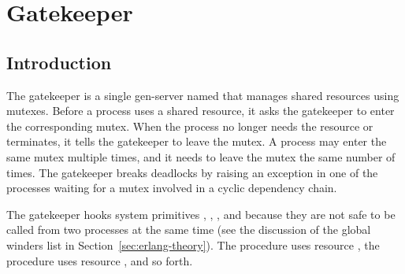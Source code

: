 %
%
%

\chapter {Gatekeeper}\label{chap:gatekeeper}

\section {Introduction}

The gatekeeper is a single gen-server named
 that manages shared resources using mutexes.
Before a process uses a shared resource, it asks the gatekeeper to
enter the corresponding mutex. When the process no longer needs the
resource or terminates, it tells the gatekeeper to leave the mutex. A
process may enter the same mutex multiple times, and it needs to leave
the mutex the same number of times.  The gatekeeper breaks deadlocks
by raising an exception in one of the processes waiting for a mutex
involved in a cyclic dependency chain.

The gatekeeper hooks system primitives ,
, , and  because
they are not safe to be called from two processes at the same time
(see the discussion of the global winders list in
Section~\ref{sec:erlang-theory}). The  procedure uses
resource , the  procedure uses resource
, and so forth.

